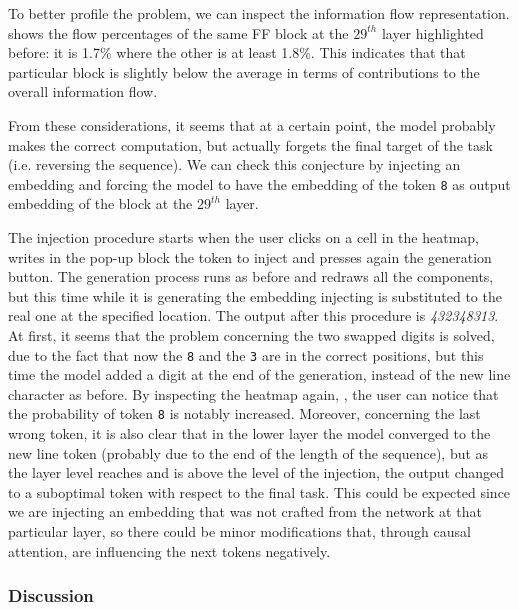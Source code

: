 {To better profile the problem, we can inspect the information flow representation.
shows the flow percentages of the same FF block at the $29^{th}$ layer highlighted before: it is 1.7\% where the other is at least 1.8\%.
This indicates that that particular block is slightly below the average in terms of contributions to the overall information flow.

From these considerations, it seems that at a certain point, the model probably makes the correct computation, but actually forgets the final target of the task (i.e. reversing the sequence).
We can check this conjecture by injecting an embedding and forcing the model to have the embedding of the token \texttt{8} as output embedding of the block at the $29^{th}$ layer.

The injection procedure starts when the user clicks on a cell in the heatmap, writes in the pop-up block the token to inject and presses again the generation button.
The generation process runs as before and redraws all the components, but this time while it is generating the embedding injecting is substituted to the real one at the specified location.
The output after this procedure is \emph{432348313}.
At first, it seems that the problem concerning the two swapped digits is solved, due to the fact that now the \texttt{8} and the \texttt{3} are in the correct positions, but this time the model added a digit at the end of the generation, instead of the new line character as before.
By inspecting the heatmap again,
, the user can notice that the probability of token \texttt{8} is notably increased.
Moreover, concerning the last wrong token, it is also clear that in the lower layer the model converged to the new line token (probably due to the end of the length of the sequence), but as the layer level reaches and is above the level of the injection, the output changed to a suboptimal token with respect to the final task.
This could be expected since we are injecting an embedding that was not crafted from the network at that particular layer, so there could be minor modifications that, through causal attention, are influencing the next tokens negatively.
}

\subsubsection{Discussion}



